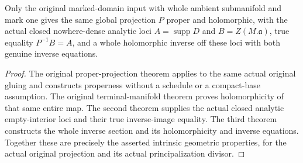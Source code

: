 \begin{theorem}
\label{hir:original-global-principalization-actual-proper-modification-geometry}
\leanok
{}
Only the original marked-domain input with whole ambient submanifold and
mark one gives the same global projection $P$ proper and holomorphic,
with the actual closed nowhere-dense analytic loci $A=\operatorname{supp}D$
and $B=Z(M.\mathfrak a)$, true equality $P^{-1}B=A$, and a whole
holomorphic inverse off these loci with both genuine inverse equations.
\end{theorem}
\begin{proof}
The original proper-projection theorem applies to the same actual
original gluing and constructs properness without a schedule or a
compact-base assumption.  The original terminal-manifold theorem proves
holomorphicity of that same entire map.  The second theorem supplies
the actual closed analytic empty-interior loci and their true inverse-image
equality.  The third theorem constructs the whole inverse section and
its holomorphicity and inverse equations.  Together these are precisely
the asserted intrinsic geometric properties, for the actual original
projection and its actual principalization divisor.
\end{proof}
